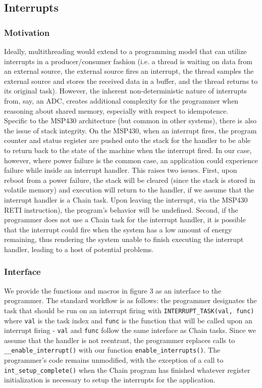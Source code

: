 \documentclass[11pt]{sensys-proc}
\newcommand{\chain}{Chain\xspace}
\begin{document}
\subsection{Interrupts}
\subsubsection{Motivation}
Ideally, multithreading would extend to a programming model that can utilize
interrupts in a producer/consumer fashion (i.e. a thread is waiting on data
from an external source, the external source fires an interrupt, the thread
samples the external source and stores the received data in a buffer, and
the thread returns to its original task). However, the inherent
non-deterministic
nature of interrupts from, say, an ADC, creates additional complexity for the
programmer when reasoning about shared memory, especially with respect to
idempotence.\\
    Specific to the MSP430 architecture (but common in other systems), there is
also the issue of stack integrity. On the MSP430, when an interrupt fires,
the program counter and status register are pushed onto the stack for
the handler to be able to return back to the state of the machine when the
interrupt fired. In our case, however, where power failure is the common
case, an application could experience failure while inside an interrupt
handler. This raises two issues. First, upon reboot from a power failure,
the stack will be cleared (since the stack is stored in volatile memory) and
execution will return to the handler, if we assume that the interrupt handler
is a \chain task. Upon leaving the interrupt, via the MSP430 RETI instruction),
the program's behavior will be undefined. Second, if the programmer does not
use a \chain task for the interrupt handler, it is possible that the interrupt
could fire when the system has a low amount of energy remaining, thus
rendering the system unable to finish executing the interrupt handler,
leading to a host of potential problems.

\subsubsection{Interface}
We provide the functions and macros in figure 3 as an interface to
the programmer. The standard workflow is as follows: the programmer
designates the task that should be run on an interrupt firing
with \texttt{INTERRUPT\_TASK(val, func)} where \texttt{val} is the task
index and \texttt{func} is the function that will be called upon an
interrupt firing - \texttt{val} and \texttt{func} follow the same
interface as \chain tasks. Since we assume that the handler is not
reentrant, the programmer replaces calls to \texttt{\_\_enable\_interrupt()}
with our function \texttt{enable\_interrupts()}.
The programmer's code remains unmodified, with the exception of a call to
\texttt{int\_setup\_complete()} when the \chain program has finished whatever
register initialization is necessary to setup the interrupts for the
application.\\
\end{document}
